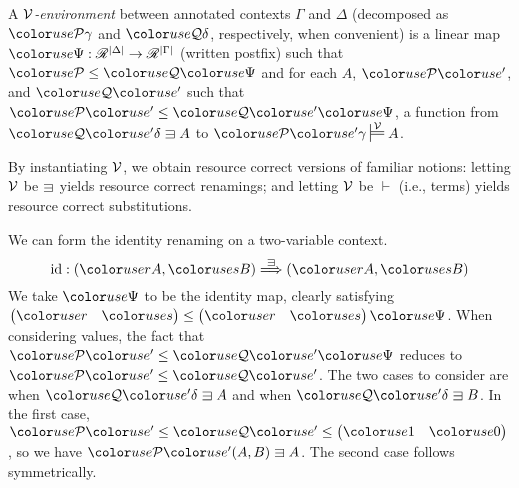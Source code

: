 
\begin{definition}[Environment]\label{def:lr-env}
  A \emph{$\mathcal V$-environment} between annotated contexts $\Gamma$ and
  $\Delta$ (decomposed as $\grP\gamma$ and $\grQ\delta$, respectively,
  when convenient) is a linear map
  $\gr\Psi : \Ann^{\size\Delta} \to \Ann^{\size\Gamma}$ (written
  postfix) such that $\grP \leq \grQ\gr\Psi$ and for each $A$,
  $\grPprime$, and $\grQprime$ such that
  $\grPprime \leq \grQprime\gr\Psi$, a function from
  $\grQprime\delta \sqni A$ to $\grPprime\gamma \sdtstile{}\V A$.

\end{definition}

By instantiating $\mathcal V$, we obtain resource correct versions of familiar
notions: letting $\mathcal V$ be $\sqni$ yields resource correct renamings;
and letting $\mathcal V$ be $\vdash$ (i.e., terms) yields resource correct
substitutions.

\begin{example}
  We can form the identity renaming on a two-variable context.
  \[
    \id : \plr{\gr rA, \gr sB} \env\sqni \plr{\gr rA, \gr sB}
  \]
  We take $\gr\Psi$ to be the identity map, clearly satisfying
  \(
    \begin{pmatrix} \gr r & \gr s \end{pmatrix} \leq
    \begin{pmatrix} \gr r & \gr s \end{pmatrix}\gr\Psi
  \).
  When considering values, the fact that $\grPprime \leq \grQprime\gr\Psi$
  reduces to $\grPprime \leq \grQprime$.
  The two cases to consider are when $\grQprime\delta \sqni A$ and when
  $\grQprime\delta \sqni B$.
  In the first case, $\grPprime \leq \grQprime \leq
  \begin{pmatrix} \gr1 & \gr0 \end{pmatrix}$, so we have
  $\grPprime\plr{A, B} \sqni A$.
  The second case follows symmetrically.
\end{example}

